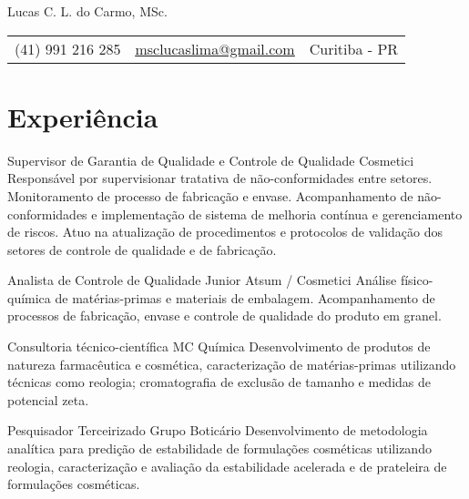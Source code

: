 \pagestyle{fancy} %
\fancyhf{} 
\renewcommand{\headrulewidth}{0pt}


\thispagestyle{empty}

\begin{center}
	
	{\LARGE Lucas C. L. do Carmo, MSc.}
	
	\vspace{6pt}
	\begin{tabular}{c|c|c}
		(41) 991 216 285 & \textcolor{Accent}{\underline{\href{mailto:msclucaslima@gmail.com}{msclucaslima@gmail.com}}} & Curitiba - PR
	\end{tabular}

	\vspace{6pt}
	
\end{center}
	

\section{Experiência}

{Supervisor de Garantia de Qualidade e Controle de Qualidade}
{Cosmetici}
{
	Responsável por supervisionar tratativa de não-conformidades entre setores.
	Monitoramento de processo de fabricação e envase.
	Acompanhamento de não-conformidades e implementação de
	sistema de melhoria contínua e gerenciamento de riscos.
	Atuo na atualização de procedimentos e protocolos de validação dos setores
	de controle de qualidade e de fabricação.
}

{Analista de Controle de Qualidade Junior}
{Atsum / Cosmetici}
{
	Análise físico-química de matérias-primas e materiais de embalagem.
	Acompanhamento de processos de fabricação, envase e controle de qualidade do
	produto em granel.
}

{Consultoria técnico-científica}
{MC Química}
{
	Desenvolvimento de produtos de natureza farmacêutica e cosmética, 
	caracterização de matérias-primas utilizando técnicas como reologia;
	cromatografia de exclusão de tamanho e medidas de potencial zeta.
}

{Pesquisador Terceirizado}
{Grupo Boticário}
{
	Desenvolvimento de metodologia analítica para predição de estabilidade
	de formulações cosméticas utilizando reologia,
	caracterização e avaliação da estabilidade acelerada e de prateleira
	de formulações cosméticas.
}


